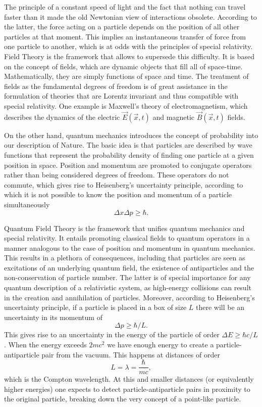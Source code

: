 The principle of a constant speed of light and the fact that nothing can travel faster than it made the old Newtonian view of interactions obsolete. According to the latter, the force acting on a particle depends on the position of all other particles at that moment. This implies an instantaneous transfer of force from one particle to another, which is at odds with the principles of special relativity. Field Theory is the framework that allows to supersede this difficulty. It is based on the concept of fields, which are dynamic objects that fill all of space-time. Mathematically, they are simply functions of space and time. The treatment of fields as the fundamental degrees of freedom is of great assistance in the formulation  of theories that are Lorentz invariant and thus compatible with special relativity. One example is Maxwell's theory of electromagnetism, which describes the dynamics of the electric $\vec{E}(\vec{x},t)$ and magnetic $\vec{B}(\vec{x},t)$ fields.

On the other hand, quantum mechanics introduces the concept of probability into our description of Nature. The basic idea is that particles are described by wave functions that represent the probability density of finding one particle at a given position in space. Position and momentum are promoted to conjugate operators rather than being considered degrees of freedom. These operators do not commute, which gives rise to Heisenberg's uncertainty principle, according to which it is not possible to know the position and momentum of a particle simultaneously
\begin{equation*}
\Delta x\Delta p\geq\hbar.
\end{equation*} 

Quantum Field Theory is the framework that unifies quantum mechanics and special relativity. It entails promoting classical fields to quantum operators in a manner analogous to the case of position and momentum in quantum mechanics. This results in a plethora of consequences, including that particles are seen as excitations of an underlying quantum field, the existence of antiparticles and the non-conservation of particle number. The latter is of special importance for any quantum description of a relativistic system, as high-energy collisions can result in the creation and annihilation of  particles. Moreover, according to Heisenberg's uncertainty principle, if a particle is placed in a box of size $L$ there will be an uncertainty in its momentum of
\begin{equation*}
\Delta p\geq\hbar/L.
\end{equation*}
This gives rise to an uncertainty in the energy of the particle of order $\Delta E\geq\hbar c/L$. When the energy exceeds $2mc^2$ we have enough energy to create a particle-antiparticle pair from the vacuum. This happens at distances of order 
\begin{equation*}
L=\lambda=\frac{\hbar}{mc},
\end{equation*}
which is the Compton wavelength. At this and smaller distances (or equivalently higher energies) one expects to detect particle-antiparticle pairs in proximity to the original particle, breaking down the very concept of a point-like particle. 

